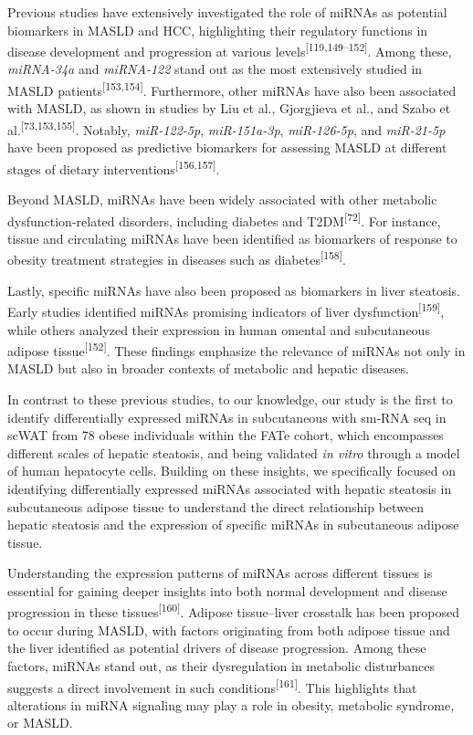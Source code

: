 \documentclass[
  11pt,
  letterpaper,
]{book}
\begin{document}
Previous studies have extensively investigated the role of miRNAs as
potential biomarkers in MASLD and HCC, highlighting their regulatory
functions in disease development and progression at various
levels\textsuperscript{{[}119,149--152{]}}. Among these,
\emph{miRNA-34a} and \emph{miRNA-122} stand out as the most extensively
studied in MASLD patients\textsuperscript{{[}153,154{]}}. Furthermore,
other miRNAs have also been associated with MASLD, as shown in studies
by Liu et al., Gjorgjieva et al., and Szabo et
al.\textsuperscript{{[}73,153,155{]}}. Notably, \emph{miR-122-5p},
\emph{miR-151a-3p}, \emph{miR-126-5p}, and \emph{miR-21-5p} have been
proposed as predictive biomarkers for assessing MASLD at different
stages of dietary interventions\textsuperscript{{[}156,157{]}}.

Beyond MASLD, miRNAs have been widely associated with other metabolic
dysfunction-related disorders, including diabetes and
T2DM\textsuperscript{{[}72{]}}. For instance, tissue and circulating
miRNAs have been identified as biomarkers of response to obesity
treatment strategies in diseases such as
diabetes\textsuperscript{{[}158{]}}.

Lastly, specific miRNAs have also been proposed as biomarkers in liver
steatosis. Early studies identified miRNAs promising indicators of liver
dysfunction\textsuperscript{{[}159{]}}, while others analyzed their
expression in human omental and subcutaneous adipose
tissue\textsuperscript{{[}152{]}}. These findings emphasize the
relevance of miRNAs not only in MASLD but also in broader contexts of
metabolic and hepatic diseases.

In contrast to these previous studies, to our knowledge, our study is
the first to identify differentially expressed miRNAs in subcutaneous
with sm-RNA seq in scWAT from 78 obese individuals within the FATe
cohort, which encompasses different scales of hepatic steatosis, and
being validated \emph{in vitro} through a model of human hepatocyte
cells. Building on these insights, we specifically focused on
identifying differentially expressed miRNAs associated with hepatic
steatosis in subcutaneous adipose tissue to understand the direct
relationship between hepatic steatosis and the expression of specific
miRNAs in subcutaneous adipose tissue.

Understanding the expression patterns of miRNAs across different tissues
is essential for gaining deeper insights into both normal development
and disease progression in these tissues\textsuperscript{{[}160{]}}.
Adipose tissue--liver crosstalk has been proposed to occur during MASLD,
with factors originating from both adipose tissue and the liver
identified as potential drivers of disease progression. Among these
factors, miRNAs stand out, as their dysregulation in metabolic
disturbances suggests a direct involvement in such
conditions\textsuperscript{{[}161{]}}. This highlights that alterations
in miRNA signaling may play a role in obesity, metabolic syndrome, or
MASLD.
\end{document}
